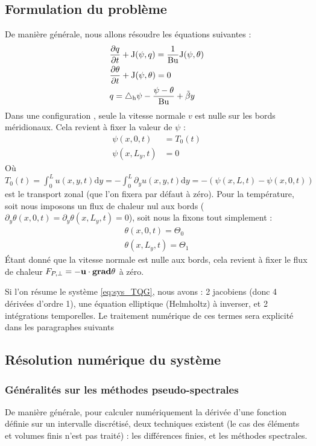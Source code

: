 \subsection{Formulation du problème}
De manière générale, nous allons résoudre les équations suivantes : 
\begin{align}
	&\frac{\partial q}{\partial t}+\mathrm{J}(\psi, q) = \frac{1}{\mathrm{Bu}}\mathrm{J}(\psi, \theta) \\
	&\frac{\partial \theta}{\partial t}+\mathrm{J}(\psi, \theta) =0 \\
	&q = \triangle_{\mathrm{h}}\psi - \frac{\psi - \theta}{\mathrm{Bu}} + \tilde{\beta} y
	\label{eq:sys_TQG}
\end{align}
Dans une configuration , seule la vitesse normale $v$ est nulle sur les bords méridionaux. Cela revient à fixer la valeur de $\psi$ : 
\begin{align}
	\psi(x, 0, t) &= T_0(t) \\
	\psi(x, L_y, t) &= 0
\end{align} 
Où $T_0(t) = \int_0^L u(x, y, t) \mathrm{d}y = -\int_0^L\partial_y u(x, y, t) \mathrm{d}y = -(\psi(x, L, t) - \psi(x, 0, t))$ est le transport zonal (que l'on fixera par défaut à zéro).
Pour la température, soit nous imposons un flux de chaleur nul aux bords ($\partial_y \theta(x, 0, t) = \partial_y \theta(x, L_y, t) = 0$), soit nous la fixons tout simplement : 
\begin{align}
	\theta(x, 0, t) = \Theta_0\\
	\theta(x, L_y, t) = \Theta_1
\end{align}
Étant donné que la vitesse normale est nulle aux bords, cela revient à fixer le flux de chaleur $F_{P, \perp} = -\mathbf{u}\cdot\mathrm{\mathbf{grad}}{\theta}$ à zéro. 

Si l'on résume le système \ref{eq:sys_TQG}, nous avons : 2 jacobiens (donc 4 dérivées d'ordre 1), une équation elliptique (Helmholtz) à inverser, et 2 intégrations temporelles. Le traitement numérique de ces termes sera explicité dans les paragraphes suivants

\subsection{Résolution numérique du système}

\subsubsection{Généralités sur les méthodes pseudo-spectrales}
\label{subsection:generalites_PS}
De manière générale, pour calculer numériquement la dérivée d'une fonction définie sur un intervalle discrétisé, deux techniques existent (le cas des éléments et volumes finis n'est pas traité) : les différences finies, et les méthodes  spectrales.

